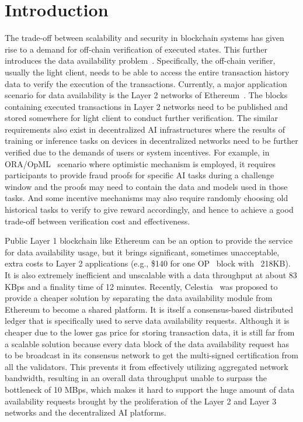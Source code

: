 \section{Introduction}

The trade-off between scalability and security in blockchain systems has given rise to a demand for off-chain verification of executed states. This further introduces the data availability problem~\cite{da}. Specifically, the off-chain verifier, usually the light client, needs to be able to access the entire transaction history data to verify the execution of the transactions. 
Currently, a major application scenario for data availability is the Layer 2 networks of Ethereum~\cite{Ethereum}. The blocks containing executed transactions in Layer 2 networks need to be published and stored somewhere for light client to conduct further verification. The similar requirements also exist in decentralized AI infrastructures where the results of training or inference tasks on devices in decentralized networks need to be further verified due to the demands of users or system incentives. 
For example, in ORA/OpML~\cite{opml} scenario where optimistic mechanism is employed, it requires participants to provide fraud proofs for specific AI tasks during a challenge window and the proofs may need to contain the data and models used in those tasks. 
And some incentive mechanisms may also require randomly choosing old historical tasks to verify to give reward accordingly, and hence to achieve a good trade-off between verification cost and effectiveness. 

Public Layer 1 blockchain like Ethereum can be an option to provide the service for data availability usage, but it brings significant, sometimes unacceptable, extra costs to Layer 2 applications (e.g., \$140 for one OP~\cite{op} block with ~218KB). It is also extremely inefficient and unscalable with a data throughput at about 83 KBps and a finality time of 12 minutes. Recently, Celestia~\cite{celestia} was proposed to provide a cheaper solution by separating the data availability module from Ethereum to become a shared platform. It is itself a consensus-based distributed ledger that is specifically used to serve data availability requests. Although it is cheaper due to the lower gas price for storing transaction data, it is still far from a scalable solution because every data block of the data availability request has to be broadcast in its consensus network to get the multi-signed certification from all the validators. This prevents it from effectively utilizing aggregated network bandwidth, resulting in an overall data throughput unable to surpass the bottleneck of 10 MBps, which makes it hard to support the huge amount of data availability requests brought by the proliferation of the Layer 2 and Layer 3 networks and the decentralized AI platforms.

